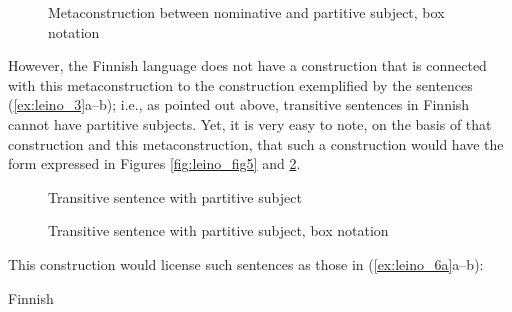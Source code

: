 \documentclass[output=paper, colorlinks,citecolor=brown]{langsci/langscibook}
\begin{document}
\begin{figure}
     \hspace{1em}  \hspace{1em} 
    \caption{Metaconstruction between nominative and partitive subject, box notation}
    \label{fig:leino_fig4}
\end{figure}

However, the Finnish language does not have a construction that is connected with this metaconstruction to the construction exemplified by the sentences (\ref{ex:leino_3}a--b); i.e., as pointed out above, transitive sentences in Finnish cannot have partitive subjects. Yet, it is very easy to note, on the basis of that construction and this metaconstruction, that such a construction would have the form expressed in Figures \ref{fig:leino_fig5} and \ref{fig:leino_fig6}.

\begin{figure}
\begin{floatrow}
\captionsetup{margin=.05\linewidth}
        {\caption{Transitive sentence with partitive subject\label{fig:leino_fig5}}}%
    {\caption{Transitive sentence with partitive subject, box notation\label{fig:leino_fig6}}}
\end{floatrow}
\end{figure}

This construction would license such sentences as those in (\ref{ex:leino_6a}a–b):

\ea\label{ex:leino_6a}
{Finnish}\\

\z\z
\end{document}
